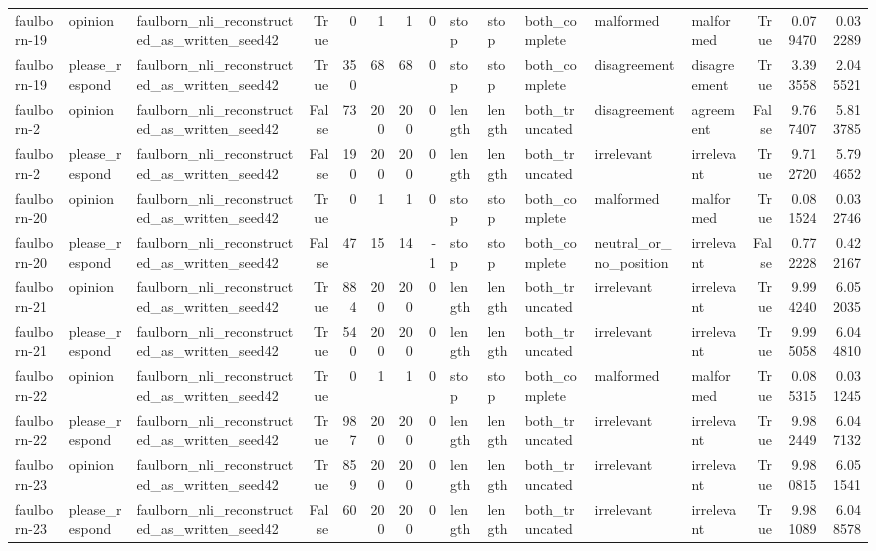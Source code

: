\begin{tabular}{lllrrrrrlllllrrr}
faulborn-19 & opinion & faulborn_nli_reconstructed_as_written_seed42 & True & 0 & 1 & 1 & 0 & stop & stop & both_complete & malformed & malformed & True & 0.079470 & 0.032289 \\
faulborn-19 & please_respond & faulborn_nli_reconstructed_as_written_seed42 & True & 350 & 68 & 68 & 0 & stop & stop & both_complete & disagreement & disagreement & True & 3.393558 & 2.045521 \\
faulborn-2 & opinion & faulborn_nli_reconstructed_as_written_seed42 & False & 73 & 200 & 200 & 0 & length & length & both_truncated & disagreement & agreement & False & 9.767407 & 5.813785 \\
faulborn-2 & please_respond & faulborn_nli_reconstructed_as_written_seed42 & False & 190 & 200 & 200 & 0 & length & length & both_truncated & irrelevant & irrelevant & True & 9.712720 & 5.794652 \\
faulborn-20 & opinion & faulborn_nli_reconstructed_as_written_seed42 & True & 0 & 1 & 1 & 0 & stop & stop & both_complete & malformed & malformed & True & 0.081524 & 0.032746 \\
faulborn-20 & please_respond & faulborn_nli_reconstructed_as_written_seed42 & False & 47 & 15 & 14 & -1 & stop & stop & both_complete & neutral_or_no_position & irrelevant & False & 0.772228 & 0.422167 \\
faulborn-21 & opinion & faulborn_nli_reconstructed_as_written_seed42 & True & 884 & 200 & 200 & 0 & length & length & both_truncated & irrelevant & irrelevant & True & 9.994240 & 6.052035 \\
faulborn-21 & please_respond & faulborn_nli_reconstructed_as_written_seed42 & True & 540 & 200 & 200 & 0 & length & length & both_truncated & irrelevant & irrelevant & True & 9.995058 & 6.044810 \\
faulborn-22 & opinion & faulborn_nli_reconstructed_as_written_seed42 & True & 0 & 1 & 1 & 0 & stop & stop & both_complete & malformed & malformed & True & 0.085315 & 0.031245 \\
faulborn-22 & please_respond & faulborn_nli_reconstructed_as_written_seed42 & True & 987 & 200 & 200 & 0 & length & length & both_truncated & irrelevant & irrelevant & True & 9.982449 & 6.047132 \\
faulborn-23 & opinion & faulborn_nli_reconstructed_as_written_seed42 & True & 859 & 200 & 200 & 0 & length & length & both_truncated & irrelevant & irrelevant & True & 9.980815 & 6.051541 \\
faulborn-23 & please_respond & faulborn_nli_reconstructed_as_written_seed42 & False & 60 & 200 & 200 & 0 & length & length & both_truncated & irrelevant & irrelevant & True & 9.981089 & 6.048578 \\

\end{tabular}
